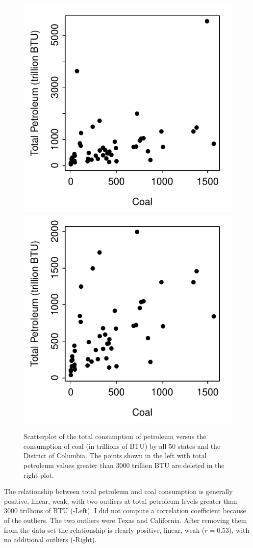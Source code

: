 \documentclass[10pt,openany]{book}\usepackage[]{graphicx}\usepackage[]{color}
\newenvironment{knitrout}{}{} %
\begin{document}
\begin{knitrout}
\color{fgcolor}\begin{figure}[hbtp]

{\centering \includegraphics[width=.4\linewidth]{Figs/scatNRG1-1} 
\includegraphics[width=.4\linewidth]{Figs/scatNRG1-2} 

}

\caption[Scatterplot of the total consumption of petroleum versus the consumption of coal (in trillions of BTU) by all 50 states and the District of Columbia]{Scatterplot of the total consumption of petroleum versus the consumption of coal (in trillions of BTU) by all 50 states and the District of Columbia.  The points shown in the left with total petroleum values greater than 3000 trillion BTU are deleted in the right plot.}\label{fig:scatNRG1}
\end{figure}


\end{knitrout}
The relationship between total petroleum and coal consumption is generally positive, linear, weak, with two outliers at total petroleum levels greater than 3000 trillions of BTU (-Left).  I did not compute a correlation coefficient because of the outliers.  The two outliers were Texas and California.  After removing them from the data set the relationship is clearly positive, linear, weak ($r=$0.53), with no additional outliers (-Right).
\end{document}
